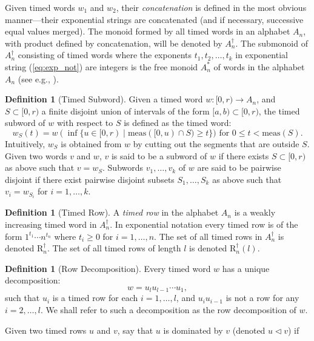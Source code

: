 \documentclass[10pt]{amsproc}
\theoremstyle{definition}
\newtheorem{definition}[theorem]{Definition}
\theoremstyle{remark}
\newcommand{\tr}{\mathrm{R}^\dagger}
\begin{document}
Given timed words $w_1$ and $w_2$, their \emph{concatenation} is defined in the most obvious manner---their exponential strings are concatenated (and if necessary, successive equal values merged).
The monoid formed by all timed words in an alphabet $A_n$, with product defined by concatenation, will be denoted by $A_n^\dagger$.
The submonoid of $A_n^\dagger$ consisting of timed words where the exponents $t_1,t_2,\dotsc,t_k$ in exponential string (\ref{eq:exp_not}) are integers is the free monoid $A_n^*$ of words in the alphabet $A_n$ (see e.g., \cite[Chapter~1]{comb-words}).
\begin{definition}
  [Timed Subword]
  \label{definition:timed-subword}
  Given a timed word $w:[0,r)\to A_n$, and $S\subset [0,r)$ a finite disjoint union of intervals of the form $[a, b)\subset [0,r)$, the timed subword of $w$ with respect to $S$ is defined as the timed word:
  \begin{displaymath}
    w_S(t) = w(\inf\{u\in [0,r)\mid \mathrm{meas}([0,u)\cap S) \geq t\}) \text{ for } 0\leq t < \mathrm{meas}(S).
  \end{displaymath}
  Intuitively, $w_S$ is obtained from $w$ by cutting out the segments that are outside $S$.
  Given two words $v$ and $w$, $v$ is said to be a subword of $w$ if there exists $S\subset [0,r)$ as above such that $v=w_S$.
  Subwords $v_1,\dotsc,v_k$ of $w$ are said to be pairwise disjoint if there exist pairwise disjoint subsets $S_1,\dotsc,S_k$ as above such that $v_i=w_{S_i}$ for $i=1,\dotsc,k$.
\end{definition}
\begin{definition}[Timed Row]
A \emph{timed row} in the alphabet $A_n$ is a weakly increasing timed word in $A_n^\dagger$.
In exponential notation every timed row is of the form $1^{t_1}\dotsb n^{t_n}$ where $t_i\geq 0$ for $i=1,\dotsc,n$.
The set of all timed rows in $A_n^\dagger$ is denoted $\tr_n$.
The set of all timed rows of length $l$ is denoted $\tr_n(l)$.
\end{definition}
\begin{definition}[Row Decomposition]
Every timed word $w$ has a unique decomposition:
\begin{displaymath}
  w = u_l u_{l-1}\dotsb u_1,
\end{displaymath}
such that $u_i$ is a timed row for each $i=1,\dotsc,l$, and $u_iu_{i-1}$ is not a row for any $i=2,\dotsc,l$.
We shall refer to such a decomposition as the row decomposition of $w$.
\end{definition}
Given two timed rows $u$ and $v$, say that $u$ is dominated by $v$ (denoted $u\lhd v$) if
\end{document}

